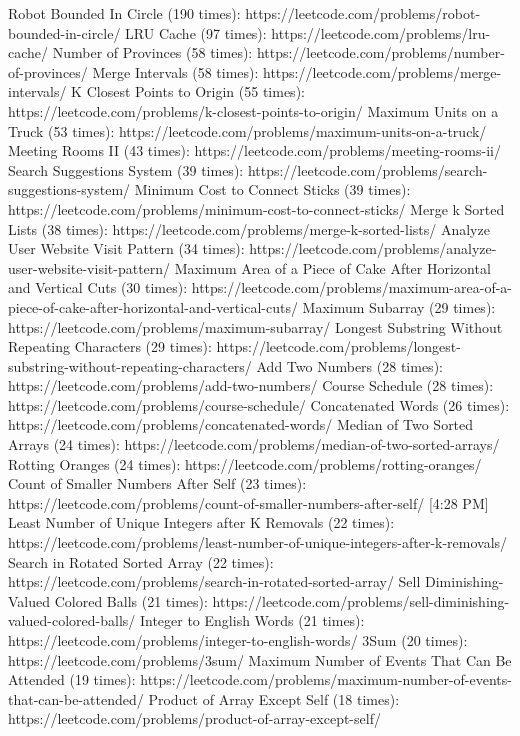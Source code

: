 Robot Bounded In Circle (190 times): https://leetcode.com/problems/robot-bounded-in-circle/
LRU Cache (97 times): https://leetcode.com/problems/lru-cache/
Number of Provinces (58 times): https://leetcode.com/problems/number-of-provinces/
Merge Intervals (58 times): https://leetcode.com/problems/merge-intervals/
K Closest Points to Origin (55 times): https://leetcode.com/problems/k-closest-points-to-origin/
Maximum Units on a Truck (53 times): https://leetcode.com/problems/maximum-units-on-a-truck/
Meeting Rooms II (43 times): https://leetcode.com/problems/meeting-rooms-ii/
Search Suggestions System (39 times): https://leetcode.com/problems/search-suggestions-system/
Minimum Cost to Connect Sticks (39 times): https://leetcode.com/problems/minimum-cost-to-connect-sticks/
Merge k Sorted Lists (38 times): https://leetcode.com/problems/merge-k-sorted-lists/
Analyze User Website Visit Pattern (34 times): https://leetcode.com/problems/analyze-user-website-visit-pattern/
Maximum Area of a Piece of Cake After Horizontal and Vertical Cuts (30 times): https://leetcode.com/problems/maximum-area-of-a-piece-of-cake-after-horizontal-and-vertical-cuts/
Maximum Subarray (29 times): https://leetcode.com/problems/maximum-subarray/
Longest Substring Without Repeating Characters (29 times): https://leetcode.com/problems/longest-substring-without-repeating-characters/
Add Two Numbers (28 times): https://leetcode.com/problems/add-two-numbers/
Course Schedule (28 times): https://leetcode.com/problems/course-schedule/
Concatenated Words (26 times): https://leetcode.com/problems/concatenated-words/
Median of Two Sorted Arrays (24 times): https://leetcode.com/problems/median-of-two-sorted-arrays/
Rotting Oranges (24 times): https://leetcode.com/problems/rotting-oranges/
Count of Smaller Numbers After Self (23 times): https://leetcode.com/problems/count-of-smaller-numbers-after-self/
[4:28 PM]
Least Number of Unique Integers after K Removals (22 times): https://leetcode.com/problems/least-number-of-unique-integers-after-k-removals/
Search in Rotated Sorted Array (22 times): https://leetcode.com/problems/search-in-rotated-sorted-array/
Sell Diminishing-Valued Colored Balls (21 times): https://leetcode.com/problems/sell-diminishing-valued-colored-balls/
Integer to English Words (21 times): https://leetcode.com/problems/integer-to-english-words/
3Sum (20 times): https://leetcode.com/problems/3sum/
Maximum Number of Events That Can Be Attended (19 times): https://leetcode.com/problems/maximum-number-of-events-that-can-be-attended/
Product of Array Except Self (18 times): https://leetcode.com/problems/product-of-array-except-self/
